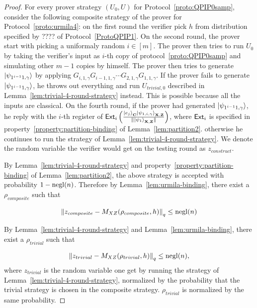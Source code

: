 \begin{proof}
For every prover strategy $(U_0,U)$ for Protocol~\ref{proto:QPIP0samp}, consider the following composite strategy of the prover for Protocol~\ref{proto:urmila4}: on the first round the verifier pick $h$ from distribution specified by ???? of Protocol~\ref{ProtoQPIP1}. On the second round, the prover start with picking a uniformaly random $i\in [m]$. The prover then tries to run $U_0$ by taking the verifier's input as $i$-th copy of protocol~\ref{proto:QPIP0samp} and simulating other $m-1$ copies by himself. The prover then   tries to generate $\ket{\psi_{1^{i-1}1,\gamma}}$ by applying $G_{i,1,\gamma}G_{i-1,1,\gamma} \cdots G_{2,1,\gamma}G_{1,1,\gamma}$. If the prover fails to generate $\ket{\psi_{1^{i-1}1,\gamma}}$, he throws out everything and run $U_{trivial,0}$ described  in  Lemma~\ref{lem:trivial-4-round-strategy} instead. This is possible because all the inputs are classical. On the fourth round, if the prover had generated $\ket{\psi_{1^{i-1}1,\gamma}}$, he reply with the $i$-th register of $\mathsf{Ext}_i\left(\frac{\ket{e_j}_{\mathbf{C}}\ket{\psi_{1,i,\gamma}}_{\mathbf{X},\mathbf{Z}}}{\|\ket{\psi_1}_{\mathbf{X},\mathbf{Z}}\|}\right)$, where $\mathsf{Ext}_i$ is specified in property~\ref{property:partition-binding} of Lemma~\ref{lem:partition2}. otherwise he continues to run the strategy of Lemma~\ref{lem:trivial-4-round-strategy}. We denote the random variable the verifier would get on the testing round as $z_{construct}$.


By Lemma~\ref{lem:trivial-4-round-strategy} and property~\ref{property:partition-binding} of Lemma~\ref{lem:partition2}, the above strategy is accepted with probability $1-\operatorname{negl}(n)$. Therefore by Lemma~\ref{lem:urmila-binding}, there exist a $\rho_{composite}$ such that 

\begin{align}
    \left\lVert z_{composite} - M_{XZ}(\rho_{composite},h) \right\rVert_q \leq \operatorname{negl}(n) 
\end{align}

By Lemma~\ref{lem:trivial-4-round-strategy} and Lemma~\ref{lem:urmila-binding}, there exist a $\rho_{trivial}$ such that

\begin{align}
    \left\lVert z_{trivial} - M_{XZ}(\rho_{trivial},h) \right\rVert_q \leq \operatorname{negl}(n), 
\end{align}
where $z_{trivial}$ is the random variable one get by running the strategy of Lemma~\ref{lem:trivial-4-round-strategy}, normalized by the probability that the trivial strategy is chosen in the composite strategy. $\rho_{trivial}$ is normalized by the same probability.


\end{proof}
